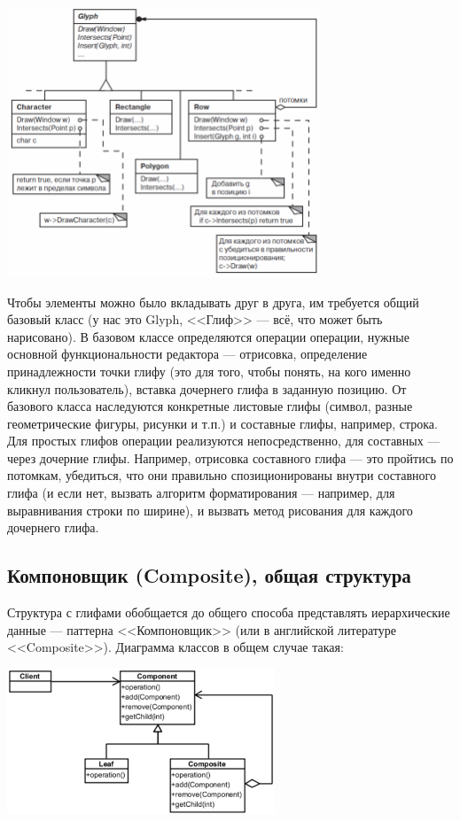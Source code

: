 \documentclass{../text-style}
\begin{document}
\begin{center}
    \includegraphics[width=0.7\textwidth]{glyphs.png}
\end{center}

Чтобы элементы можно было вкладывать друг в друга, им требуется общий базовый класс (у нас это Glyph, <<Глиф>> --- всё, что может быть нарисовано). В базовом классе определяются операции операции, нужные основной функциональности редактора --- отрисовка, определение принадлежности точки глифу (это для того, чтобы понять, на кого именно кликнул пользователь), вставка дочернего глифа в заданную позицию. От базового класса наследуются конкретные листовые глифы (символ, разные геометрические фигуры, рисунки и т.п.) и составные глифы, например, строка. Для простых глифов операции реализуются непосредственно, для составных --- через дочерние глифы. Например, отрисовка составного глифа --- это пройтись по потомкам, убедиться, что они правильно спозиционированы внутри составного глифа (и если нет, вызвать алгоритм форматирования --- например, для выравнивания строки по ширине), и вызвать метод рисования для каждого дочернего глифа.

\subsection{Компоновщик (Composite), общая структура}

Структура с глифами обобщается до общего способа представлять иерархические данные --- паттерна <<Компоновщик>> (или в английской литературе <<Composite>>). Диаграмма классов в общем случае такая:

\begin{center}
    \includegraphics[width=0.6\textwidth]{composite.png}
\end{center}
\end{document}
